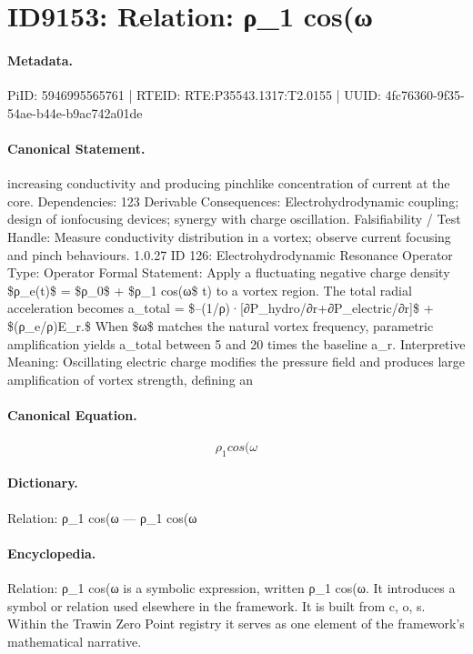 \section*{ID9153: Relation: ρ\_1 cos(ω}
\paragraph{Metadata.}
PiID: 5946995565761 | RTEID: RTE:P35543.1317:T2.0155 | UUID: 4fc76360-9f35-54ae-b44e-b9ac742a01de

\paragraph{Canonical Statement.}
increasing conductivity and producing pinchlike concentration of current at the core. Dependencies: 123 Derivable Consequences: Electrohydrodynamic coupling; design of ionfocusing devices; synergy with charge oscillation. Falsifiability / Test Handle: Measure conductivity distribution in a vortex; observe current focusing and pinch behaviours. 1.0.27 ID 126: Electrohydrodynamic Resonance Operator Type: Operator Formal Statement: Apply a fluctuating negative charge density \$ρ\_e(t)\$ = \$ρ\_0\$ + \$ρ\_1 cos(ω\$ t) to a vortex region. The total radial acceleration becomes a\_total = \$–(1/ρ)·[∂P\_hydro/∂r+∂P\_electric/∂r]\$ + \$(ρ\_e/ρ)E\_r.\$ When \$ω\$ matches the natural vortex frequency, parametric amplification yields a\_total between 5 and 20 times the baseline a\_r. Interpretive Meaning: Oscillating electric charge modifies the pressure field and produces large amplification of vortex strength, defining an

\paragraph{Canonical Equation.}
\[
ρ_1 cos(ω
\]

\paragraph{Dictionary.}
Relation: ρ\_1 cos(ω — ρ\_1 cos(ω

\paragraph{Encyclopedia.}
Relation: ρ\_1 cos(ω is a symbolic expression, written ρ\_1 cos(ω. It introduces a symbol or relation used elsewhere in the framework. It is built from c, o, s. Within the Trawin Zero Point registry it serves as one element of the framework's mathematical narrative.
